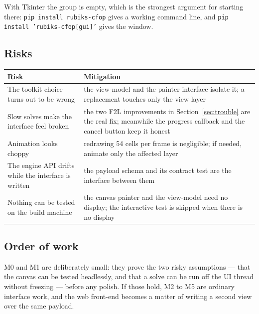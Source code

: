 With Tkinter the group is empty, which is the strongest argument for starting there:
\texttt{pip install rubiks-cfop} gives a working command line, and
\texttt{pip install 'rubiks-cfop[gui]'} gives the window.

\subsection{Risks}

\begin{longtable}{@{}p{5.4cm}p{8.8cm}@{}}
\toprule
Risk & Mitigation \\
\midrule
\endhead
The toolkit choice turns out to be wrong & the view-model and the painter interface
isolate it; a replacement touches only the view layer \\
Slow solves make the interface feel broken & the two F2L improvements in
Section~\ref{sec:trouble} are the real fix; meanwhile the progress callback and the
cancel button keep it honest \\
Animation looks choppy & redrawing 54 cells per frame is negligible; if needed,
animate only the affected layer \\
The engine API drifts while the interface is written & the payload schema and its
contract test are the interface between them \\
Nothing can be tested on the build machine & the canvas painter and the view-model
need no display; the interactive test is skipped when there is no display \\
\bottomrule
\end{longtable}

\subsection{Order of work}

M0 and M1 are deliberately small: they prove the two risky assumptions --- that the
canvas can be tested headlessly, and that a solve can be run off the UI thread
without freezing --- before any polish.  If those hold, M2 to M5 are ordinary
interface work, and the web front-end becomes a matter of writing a second view over
the same payload.
